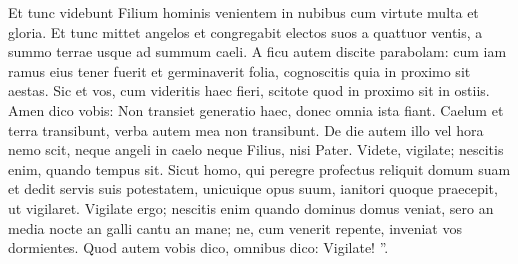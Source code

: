\begin{biblechapter}
\begin{biblechapter}
\begin{biblechapter}
\begin{biblechapter}
\begin{biblechapter}
\begin{biblechapter}
\begin{biblechapter}
\begin{biblechapter}
\begin{biblechapter}
\begin{biblechapter}
\begin{biblechapter}
\begin{biblechapter}
\begin{biblechapter}
 \verse Et tunc videbunt Filium hominis venientem in nubibus cum virtute multa et gloria. 
\verse Et tunc mittet angelos et congregabit electos suos a quattuor ventis, a summo terrae usque ad summum caeli.
 \verse A ficu autem discite parabolam: cum iam ramus eius tener fuerit et germinaverit folia, cognoscitis quia in proximo sit aestas. 
\verse Sic et vos, cum videritis haec fieri, scitote quod in proximo sit in ostiis. 
\verse Amen dico vobis: Non transiet generatio haec, donec omnia ista fiant. 
\verse Caelum et terra transibunt, verba autem mea non transibunt. 
\verse De die autem illo vel hora nemo scit, neque angeli in caelo neque Filius, nisi Pater.
 \verse Videte, vigilate; nescitis enim, quando tempus sit. 
\verse Sicut homo, qui peregre profectus reliquit domum suam et dedit servis suis potestatem, unicuique opus suum, ianitori quoque praecepit, ut vigilaret. 
\verse Vigilate ergo; nescitis enim quando dominus domus veniat, sero an media nocte an galli cantu an mane; 
\verse ne, cum venerit repente, inveniat vos dormientes. 
\verse Quod autem vobis dico, omnibus dico: Vigilate! ”.
 

\end{biblechapter}
\end{biblechapter}
\end{biblechapter}
\end{biblechapter}
\end{biblechapter}
\end{biblechapter}
\end{biblechapter}
\end{biblechapter}
\end{biblechapter}
\end{biblechapter}
\end{biblechapter}
\end{biblechapter}
\end{biblechapter}
